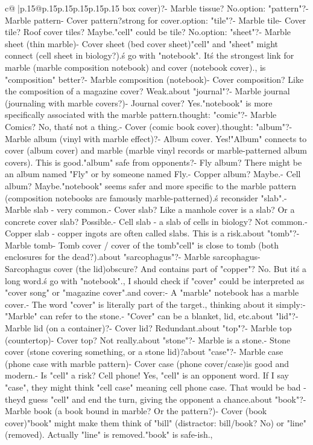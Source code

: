 \documentclass{article}
\begin{document}
{\begin{supertabular}{c@{$\;$}|p{.15\linewidth}@{}p{.15\linewidth}p{.15\linewidth}p{.15\linewidth}p{.15\linewidth}p{.15\linewidth}}
{{{box cover)?\n- Marble tissue? No.\n\nAnother option: "pattern"?\n- Marble pattern\n- Cover pattern?\nNot strong for cover.\n\nAnother option: "tile"?\n- Marble tile\n- Cover tile? Roof cover tiles? Maybe.\nBut "cell" could be tile? No.\n\nAnother option: "sheet"?\n- Marble sheet (thin marble)\n- Cover sheet (bed cover sheet)\nBut "cell" and "sheet" might connect (cell sheet in biology?).\n\nLet\'s go with "notebook". It\'s the strongest link for marble (marble composition notebook) and cover (notebook cover).\n\nWait, is "composition" better?\n- Marble composition (notebook)\n- Cover composition? Like the composition of a magazine cover? Weak.\n\nHow about "journal"?\n- Marble journal (journaling with marble covers?)\n- Journal cover? Yes.\n\nBut "notebook" is more specifically associated with the marble pattern.\n\nAnother thought: "comic"?\n- Marble Comics? No, that\'s not a thing.\n- Cover (comic book cover).\n\nAnother thought: "album"?\n- Marble album (vinyl with marble effect)?\n- Album cover. Yes!\n"Album" connects to cover (album cover) and marble (marble vinyl records or marble-patterned album covers). This is good.\n\nIs "album" safe from opponents?\n- Fly album? There might be an album named "Fly" or by someone named Fly.\n- Copper album? Maybe.\n- Cell album? Maybe.\n\nBut "notebook" seems safer and more specific to the marble pattern (composition notebooks are famously marble-patterned).\n\nLet\'s reconsider "slab".\n- Marble slab - very common.\n- Cover slab? Like a manhole cover is a slab? Or a concrete cover slab? Possible.\n- Cell slab - a slab of cells in biology? Not common.\n- Copper slab - copper ingots are often called slabs. This is a risk.\n\nWhat about "tomb"?\n- Marble tomb\n- Tomb cover / cover of the tomb\nBut "cell" is close to tomb (both enclosures for the dead?).\n\nHow about "sarcophagus"?\n- Marble sarcophagus\n- Sarcophagus cover (the lid)\nToo obscure? And contains part of "copper"? No. But it\'s a long word.\n\nLet\'s go with "notebook".\n\nWait, I should check if "cover" could be interpreted as "cover song" or "magazine cover".\nMarble and cover:\n- A "marble" notebook has a marble cover.\n- The word "cover" is literally part of the target.\n\nActually, thinking about it simply:\n- "Marble" can refer to the stone.\n- "Cover" can be a blanket, lid, etc.\n\nWhat about "lid"?\n- Marble lid (on a container)?\n- Cover lid? Redundant.\n\nWhat about "top"?\n- Marble top (countertop)\n- Cover top? Not really.\n\nWhat about "stone"?\n- Marble is a stone.\n- Stone cover (stone covering something, or a stone lid)?\n\nWhat about "case"?\n- Marble case (phone case with marble pattern)\n- Cover case (phone cover/case)\nThis is good and modern.\n- Is "cell" a risk? Cell phone! Yes, "cell" is an opponent word. If I say "case", they might think "cell case" meaning cell phone case. That would be bad - they\'d guess "cell" and end the turn, giving the opponent a chance.\n\nWhat about "book"?\n- Marble book (a book bound in marble? Or the pattern?)\n- Cover (book cover)\nBut "book" might make them think of "bill" (distractor: bill/book? No) or "line" (removed). Actually "line" is removed.\nBut "book" is safe-ish.\n\nWait, }}}
\end{supertabular}}
\end{document}
